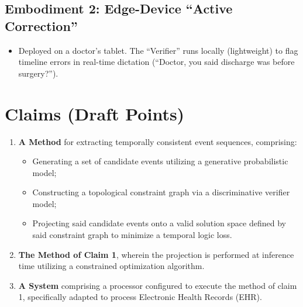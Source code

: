 \documentclass[12pt,a4paper]{article}
\begin{document}
\subsection{Embodiment 2: Edge-Device ``Active Correction''}
\begin{itemize}
    \item Deployed on a doctor's tablet. The ``Verifier'' runs locally (lightweight) to flag timeline errors in real-time dictation (``Doctor, you said discharge was before surgery?'').
\end{itemize}

\section{Claims (Draft Points)}

\begin{enumerate}
    \item \textbf{A Method} for extracting temporally consistent event sequences, comprising:
    \begin{itemize}
        \item Generating a set of candidate events utilizing a generative probabilistic model;
        \item Constructing a topological constraint graph via a discriminative verifier model;
        \item Projecting said candidate events onto a valid solution space defined by said constraint graph to minimize a temporal logic loss.
    \end{itemize}

    \item \textbf{The Method of Claim 1}, wherein the projection is performed at inference time utilizing a constrained optimization algorithm.

    \item \textbf{A System} comprising a processor configured to execute the method of claim 1, specifically adapted to process Electronic Health Records (EHR).
\end{enumerate}
\end{document}
